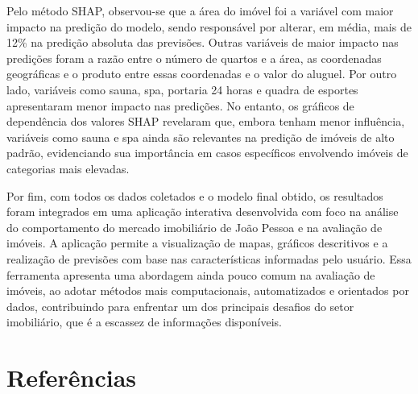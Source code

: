 \documentclass[
  12pt,
  a4paper,
]{scrreprt}
\begin{document}
\vspace{12pt}

Pelo método SHAP, observou-se que a área do imóvel foi a variável com
maior impacto na predição do modelo, sendo responsável por alterar, em
média, mais de 12\% na predição absoluta das previsões. Outras variáveis
de maior impacto nas predições foram a razão entre o número de quartos e
a área, as coordenadas geográficas e o produto entre essas coordenadas e
o valor do aluguel. Por outro lado, variáveis como sauna, spa, portaria
24 horas e quadra de esportes apresentaram menor impacto nas predições.
No entanto, os gráficos de dependência dos valores SHAP revelaram que,
embora tenham menor influência, variáveis como sauna e spa ainda são
relevantes na predição de imóveis de alto padrão, evidenciando sua
importância em casos específicos envolvendo imóveis de categorias mais
elevadas.

\vspace{12pt}

Por fim, com todos os dados coletados e o modelo final obtido, os
resultados foram integrados em uma aplicação interativa desenvolvida com
foco na análise do comportamento do mercado imobiliário de João Pessoa e
na avaliação de imóveis. A aplicação permite a visualização de mapas,
gráficos descritivos e a realização de previsões com base nas
características informadas pelo usuário. Essa ferramenta apresenta uma
abordagem ainda pouco comum na avaliação de imóveis, ao adotar métodos
mais computacionais, automatizados e orientados por dados, contribuindo
para enfrentar um dos principais desafios do setor imobiliário, que é a
escassez de informações disponíveis.

\chapter*{\texorpdfstring{\centering Referências}{Referências}}\label{referuxeancias}

\end{document}
